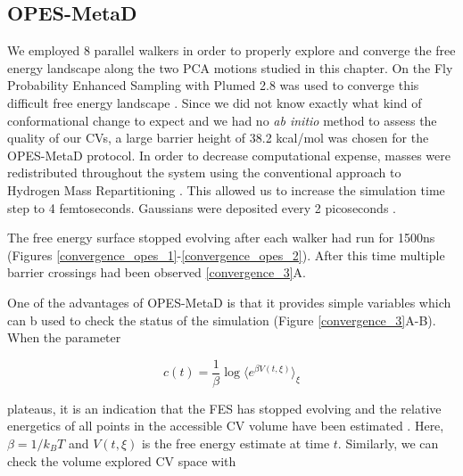 
\subsection{OPES-MetaD}
We employed 8 parallel walkers in order to properly explore and converge the free energy landscape along the two PCA motions studied in this chapter. On the Fly Probability Enhanced Sampling with Plumed 2.8 was used to converge this difficult free energy landscape \cite{invernizzi2020, tribello2014}. Since we did not know exactly what kind of conformational change to expect and we had no \textit {ab initio} method to assess the quality of our CVs, a large barrier height of 38.2 kcal/mol was chosen for the OPES-MetaD protocol. In order to decrease computational expense, masses were redistributed throughout the system using the conventional approach to Hydrogen Mass Repartitioning \cite{hopkins2015, balusek2019}. This allowed us to increase the simulation time step to 4 femtoseconds. Gaussians were deposited every 2 picoseconds .

The free energy surface stopped evolving after each walker had run for 1500ns (Figures \ref{convergence_opes_1}-\ref{convergence_opes_2}). After this time multiple barrier crossings had been observed \ref{convergence_3}A.

One of the advantages of OPES-MetaD is that it provides simple variables which can b used to check the status of the simulation (Figure \ref{convergence_3}A-B). When the parameter 

\begin{equation}
	c(t) = \frac{1}{\beta} \log \langle e^{\beta V(t,\xi)} \rangle_\xi
\end{equation} 

plateaus, it is an indication that the FES has stopped evolving and the relative energetics of all points in the accessible CV volume have been estimated \cite{invernizzi2020, tiwary2015}. Here, $\beta=1/k_BT$ and $V(t,\xi)$ is the free energy estimate at time $t$. Similarly, we can check the volume explored CV space with  

